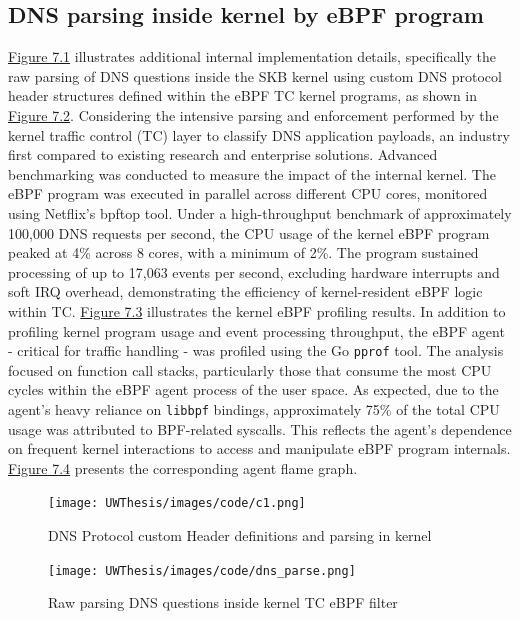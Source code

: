 \documentclass [11pt, proquest] {uwthesis}[2020/02/24]
\begin{document}
\subsection{DNS parsing inside kernel by eBPF  program}
\hyperref[fig:c1]{Figure 7.1} illustrates additional internal implementation details, specifically the raw parsing of DNS questions inside the SKB kernel using custom DNS protocol header structures defined within the eBPF TC kernel programs, as shown in \hyperref[fig:c2]{Figure 7.2}. Considering the intensive parsing and enforcement performed by the kernel traffic control (TC) layer to classify DNS application payloads, an industry first compared to existing research and enterprise solutions. Advanced benchmarking was conducted to measure the impact of the internal kernel. The eBPF program was executed in parallel across different CPU cores, monitored using Netflix’s bpftop tool. Under a high-throughput benchmark of approximately 100,000 DNS requests per second, the CPU usage of the kernel eBPF program peaked at 4\% across 8 cores, with a minimum of 2\%. The program sustained processing of up to 17,063 events per second, excluding hardware interrupts and soft IRQ overhead, demonstrating the efficiency of kernel-resident eBPF logic within TC. \hyperref[fig:c3]{Figure 7.3} illustrates the kernel eBPF profiling results. In addition to profiling kernel program usage and event processing throughput, the eBPF agent - critical for traffic handling - was profiled using the Go \texttt{pprof} tool. The analysis focused on function call stacks, particularly those that consume the most CPU cycles within the eBPF agent process of the user space. As expected, due to the agent’s heavy reliance on \texttt{libbpf} bindings, approximately 75\% of the total CPU usage was attributed to BPF-related syscalls. This reflects the agent’s dependence on frequent kernel interactions to access and manipulate eBPF program internals. \hyperref[fig:c4]{Figure 7.4} presents the corresponding agent flame graph. 

\begin{figure}
    \centering
  \texttt{[image: UWThesis/images/code/c1.png]}
  \caption{DNS Protocol custom Header definitions and parsing in kernel}
  \label{fig:c1}
\end{figure}


\begin{figure}[H]
    \centering
    \texttt{[image: UWThesis/images/code/dns\_parse.png]}
    \caption{Raw parsing DNS questions inside kernel TC eBPF filter}
    \label{fig:c2}
\end{figure}
\end{document}
